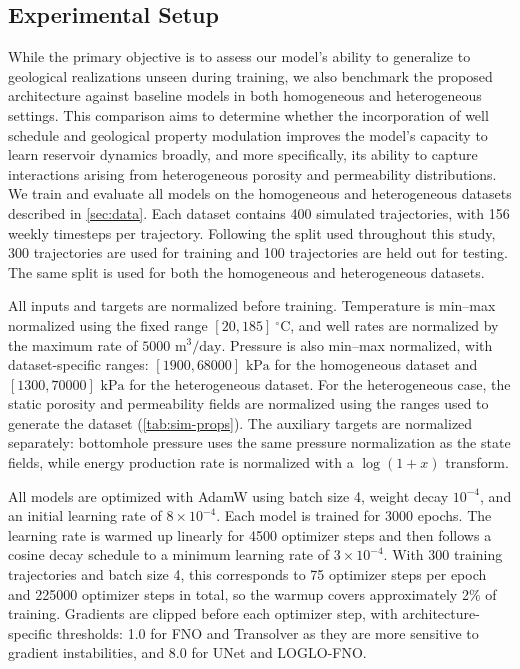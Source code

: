 \documentclass[pdflatex,sn-mathphys-ay]{sn-jnl}
\begin{document}
\subsection{Experimental Setup}
\label{sec:setup}
While the primary objective is to assess our model's ability to generalize to geological realizations unseen during training, we also benchmark the proposed architecture against baseline models in both homogeneous and heterogeneous settings. This comparison aims to determine whether the incorporation of well schedule and geological property modulation improves the model's capacity to learn reservoir dynamics broadly, and more specifically, its ability to capture interactions arising from heterogeneous porosity and permeability distributions.
We train and evaluate all models on the homogeneous and heterogeneous datasets
described in \cref{sec:data}. Each dataset contains 400 simulated trajectories,
with 156 weekly timesteps per trajectory. Following the split used throughout
this study, 300 trajectories are used for training and 100 trajectories are held
out for testing. The same split is used for both the homogeneous and
heterogeneous datasets.

All inputs and targets are normalized before training. Temperature is min--max
normalized using the fixed range \([20,185]\ ^\circ\mathrm{C}\), and well rates
are normalized by the maximum rate of \(5000\) $\mathrm{m}^3/\mathrm{day}$. 
Pressure is also min--max
normalized, with dataset-specific ranges: \([1900,68000]\) $\mathrm{kPa}$ for the homogeneous
dataset and \([1300,70000]\) $\mathrm{kPa}$ for the heterogeneous dataset. 
For the heterogeneous
case, the static porosity and permeability fields are normalized using the
ranges used to generate the dataset (\cref{tab:sim-props}). The auxiliary targets are normalized
separately: bottomhole pressure uses the same pressure normalization as the state
fields, while energy production rate is normalized with a \(\log(1+x)\)
transform.

All models are optimized with AdamW \cite{} using batch size 4,
weight decay \(10^{-4}\), and an initial learning rate of \(8\times 10^{-4}\).
Each model is trained for 3000 epochs. The learning rate is warmed up linearly
for 4500 optimizer steps and then follows a cosine decay schedule to a minimum
learning rate of \(3\times 10^{-4}\). With 300 training trajectories and batch
size 4, this corresponds to 75 optimizer steps per epoch and 225000 optimizer
steps in total, so the warmup covers approximately 2\% of training. Gradients
are clipped before each optimizer step, with architecture-specific thresholds:
1.0 for FNO and Transolver as they are more sensitive to gradient instabilities, 
and 8.0 for UNet and LOGLO-FNO.
\end{document}
